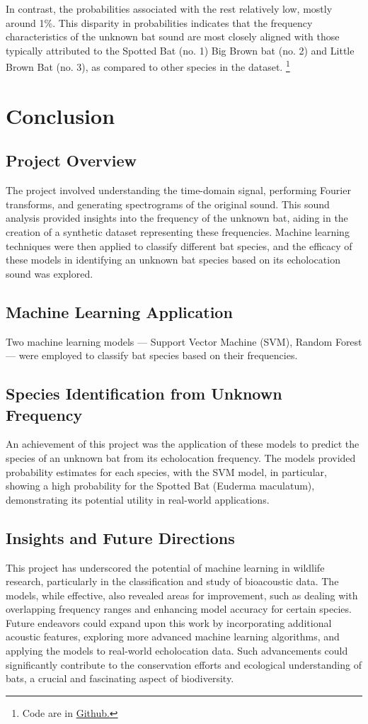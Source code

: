 \documentclass[12pt]{article}
\begin{document}
In contrast, the probabilities associated with the rest relatively low, mostly around 1\%. This disparity in probabilities indicates that the frequency characteristics of the unknown bat sound are most closely aligned with those typically attributed to the Spotted Bat (no. 1) Big Brown bat (no. 2) and Little Brown Bat (no. 3), as compared to other species in the dataset. \footnote{Code are in \href{https://github.com/hoang-nguyen13/Bat_Sound.git}{Github.}}


\section{Conclusion}

\subsection{Project Overview}
The project involved understanding the time-domain signal, performing Fourier transforms, and generating spectrograms of the original sound. This sound analysis provided insights into the frequency of the unknown bat, aiding in the creation of a synthetic dataset representing these frequencies. Machine learning techniques were then applied to classify different bat species, and the efficacy of these models in identifying an unknown bat species based on its echolocation sound was explored.
\subsection{Machine Learning Application}
Two machine learning models — Support Vector Machine (SVM), Random Forest — were employed to classify bat species based on their frequencies.
\subsection{Species Identification from Unknown Frequency}
An achievement of this project was the application of these models to predict the species of an unknown bat from its echolocation frequency. The models provided probability estimates for each species, with the SVM model, in particular, showing a high probability for the Spotted Bat (Euderma maculatum), demonstrating its potential utility in real-world applications.

\subsection{Insights and Future Directions}
This project has underscored the potential of machine learning in wildlife research, particularly in the classification and study of bioacoustic data. The models, while effective, also revealed areas for improvement, such as dealing with overlapping frequency ranges and enhancing model accuracy for certain species.
Future endeavors could expand upon this work by incorporating additional acoustic features, exploring more advanced machine learning algorithms, and applying the models to real-world echolocation data. Such advancements could significantly contribute to the conservation efforts and ecological understanding of bats, a crucial and fascinating aspect of biodiversity.
\end{document}
